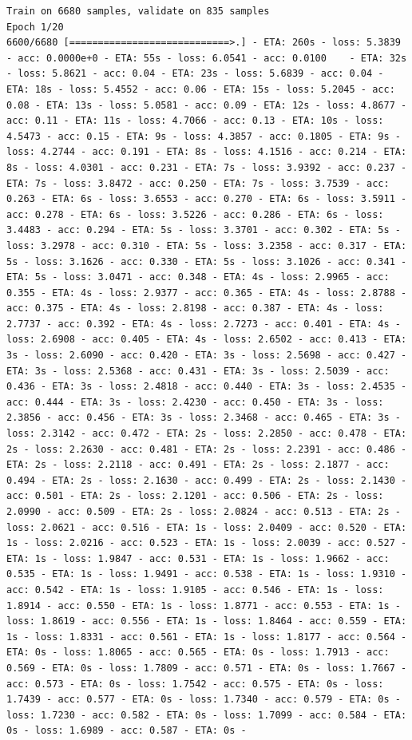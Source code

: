 \documentclass[11pt]{article}
\begin{document}
    \begin{Verbatim}[commandchars=\\\{\}]
Train on 6680 samples, validate on 835 samples
Epoch 1/20
6600/6680 [============================>.] - ETA: 260s - loss: 5.3839 - acc: 0.0000e+0 - ETA: 55s - loss: 6.0541 - acc: 0.0100    - ETA: 32s - loss: 5.8621 - acc: 0.04 - ETA: 23s - loss: 5.6839 - acc: 0.04 - ETA: 18s - loss: 5.4552 - acc: 0.06 - ETA: 15s - loss: 5.2045 - acc: 0.08 - ETA: 13s - loss: 5.0581 - acc: 0.09 - ETA: 12s - loss: 4.8677 - acc: 0.11 - ETA: 11s - loss: 4.7066 - acc: 0.13 - ETA: 10s - loss: 4.5473 - acc: 0.15 - ETA: 9s - loss: 4.3857 - acc: 0.1805 - ETA: 9s - loss: 4.2744 - acc: 0.191 - ETA: 8s - loss: 4.1516 - acc: 0.214 - ETA: 8s - loss: 4.0301 - acc: 0.231 - ETA: 7s - loss: 3.9392 - acc: 0.237 - ETA: 7s - loss: 3.8472 - acc: 0.250 - ETA: 7s - loss: 3.7539 - acc: 0.263 - ETA: 6s - loss: 3.6553 - acc: 0.270 - ETA: 6s - loss: 3.5911 - acc: 0.278 - ETA: 6s - loss: 3.5226 - acc: 0.286 - ETA: 6s - loss: 3.4483 - acc: 0.294 - ETA: 5s - loss: 3.3701 - acc: 0.302 - ETA: 5s - loss: 3.2978 - acc: 0.310 - ETA: 5s - loss: 3.2358 - acc: 0.317 - ETA: 5s - loss: 3.1626 - acc: 0.330 - ETA: 5s - loss: 3.1026 - acc: 0.341 - ETA: 5s - loss: 3.0471 - acc: 0.348 - ETA: 4s - loss: 2.9965 - acc: 0.355 - ETA: 4s - loss: 2.9377 - acc: 0.365 - ETA: 4s - loss: 2.8788 - acc: 0.375 - ETA: 4s - loss: 2.8198 - acc: 0.387 - ETA: 4s - loss: 2.7737 - acc: 0.392 - ETA: 4s - loss: 2.7273 - acc: 0.401 - ETA: 4s - loss: 2.6908 - acc: 0.405 - ETA: 4s - loss: 2.6502 - acc: 0.413 - ETA: 3s - loss: 2.6090 - acc: 0.420 - ETA: 3s - loss: 2.5698 - acc: 0.427 - ETA: 3s - loss: 2.5368 - acc: 0.431 - ETA: 3s - loss: 2.5039 - acc: 0.436 - ETA: 3s - loss: 2.4818 - acc: 0.440 - ETA: 3s - loss: 2.4535 - acc: 0.444 - ETA: 3s - loss: 2.4230 - acc: 0.450 - ETA: 3s - loss: 2.3856 - acc: 0.456 - ETA: 3s - loss: 2.3468 - acc: 0.465 - ETA: 3s - loss: 2.3142 - acc: 0.472 - ETA: 2s - loss: 2.2850 - acc: 0.478 - ETA: 2s - loss: 2.2630 - acc: 0.481 - ETA: 2s - loss: 2.2391 - acc: 0.486 - ETA: 2s - loss: 2.2118 - acc: 0.491 - ETA: 2s - loss: 2.1877 - acc: 0.494 - ETA: 2s - loss: 2.1630 - acc: 0.499 - ETA: 2s - loss: 2.1430 - acc: 0.501 - ETA: 2s - loss: 2.1201 - acc: 0.506 - ETA: 2s - loss: 2.0990 - acc: 0.509 - ETA: 2s - loss: 2.0824 - acc: 0.513 - ETA: 2s - loss: 2.0621 - acc: 0.516 - ETA: 1s - loss: 2.0409 - acc: 0.520 - ETA: 1s - loss: 2.0216 - acc: 0.523 - ETA: 1s - loss: 2.0039 - acc: 0.527 - ETA: 1s - loss: 1.9847 - acc: 0.531 - ETA: 1s - loss: 1.9662 - acc: 0.535 - ETA: 1s - loss: 1.9491 - acc: 0.538 - ETA: 1s - loss: 1.9310 - acc: 0.542 - ETA: 1s - loss: 1.9105 - acc: 0.546 - ETA: 1s - loss: 1.8914 - acc: 0.550 - ETA: 1s - loss: 1.8771 - acc: 0.553 - ETA: 1s - loss: 1.8619 - acc: 0.556 - ETA: 1s - loss: 1.8464 - acc: 0.559 - ETA: 1s - loss: 1.8331 - acc: 0.561 - ETA: 1s - loss: 1.8177 - acc: 0.564 - ETA: 0s - loss: 1.8065 - acc: 0.565 - ETA: 0s - loss: 1.7913 - acc: 0.569 - ETA: 0s - loss: 1.7809 - acc: 0.571 - ETA: 0s - loss: 1.7667 - acc: 0.573 - ETA: 0s - loss: 1.7542 - acc: 0.575 - ETA: 0s - loss: 1.7439 - acc: 0.577 - ETA: 0s - loss: 1.7340 - acc: 0.579 - ETA: 0s - loss: 1.7230 - acc: 0.582 - ETA: 0s - loss: 1.7099 - acc: 0.584 - ETA: 0s - loss: 1.6989 - acc: 0.587 - ETA: 0s - 
\end{Verbatim}
\end{document}
